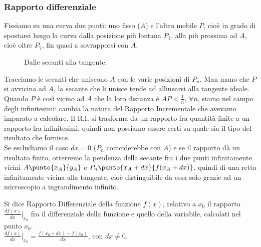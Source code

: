 \subsubsection{Rapporto differenziale}
\label{subsubsec:diff01_rappdiff}

\begin{esempio}
Fissiamo su una curva due punti: uno fisso ($A$) e l'altro mobile $P$, cioè 
in 
grado di spostarsi lungo la curva dalla posizione più lontana $P_1$, alla 
più 
prossima ad $A$, cioè oltre $P_7$, fin quasi a sovrapporsi con $A$.

\begin{figure}[h]
\begin{inaccessibleblock}
 \begin{center}
\secanticurva
 \end{center}
\end{inaccessibleblock}
\caption{Dalle secanti alla tangente.} \label{fig:diff01_sectang}
\end{figure}
\end{esempio}

Tracciamo le secanti che uniscono $A$ con le varie posizioni di $P_n$. 
Man mano che $P$ si avvicina ad $A$, la secante che li unisce tende 
ad allinearsi alla tangente ideale.\\
Quando $P$ è così vicino ad $A$ che la loro distanza è 
$\overline{AP}<\frac{1}{n}$,
$\forall n$, siamo nel campo degli infinitesimi: cambia la natura del 
Rapporto Incrementale che avevamo imparato a calcolare. Il R.I. si 
trasforma da un rapporto fra quantità finite a un rapporto fra infinitesimi,
quindi non possiamo essere certi su quale sia il tipo del risultato che 
fornisce.\\
Se escludiamo il caso $dx=0$ ($P_n$ coinciderebbe con $A$) e se il rapporto
dà un risultato finito, otterremo la pendenza della secante fra i due 
punti infinitamente vicini $A\punto{x_A}{y_A}$ e $P_n\punto{x_A+dx}{f(x_A+dx)}$,
quindi di una retta infinitamente vicina alla tangente, cioè distinguibile da 
essa solo grazie ad un microscopio a ingrandimento infinito.

\begin{definizione}
 Si dice Rapporto Differenziale della funzione $f(x)$, relativo a $x_0$
 il rapporto $\frac{df(x)}{dx}\big|_{x_0}$ fra il differenziale della 
funzione  e quello della variabile, calcolati nel punto $x_0$. \\
 $\frac{df(x)}{dx}\big|_{x_0}=\frac{f(x_0+dx)-f(x_0)}{dx}$, con $dx\ne 0$.
\end{definizione}

